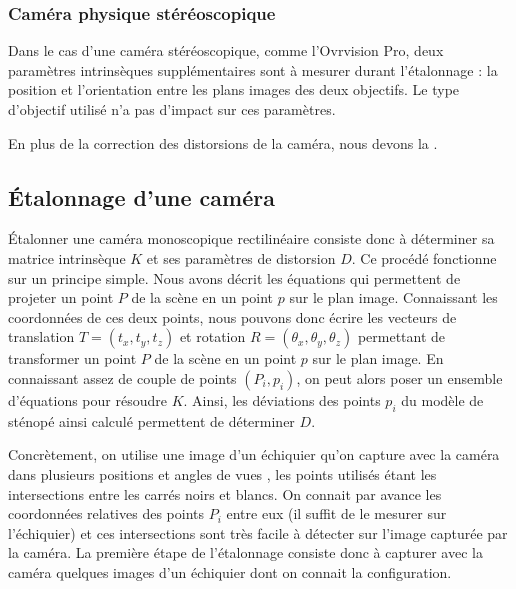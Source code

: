 \subsubsection{Caméra physique stéréoscopique}
Dans le cas d'une caméra stéréoscopique, comme l'Ovrvision Pro, deux paramètres intrinsèques supplémentaires sont à mesurer durant l'étalonnage : la position et l'orientation entre les plans images des deux objectifs. Le type d'objectif utilisé n'a pas d'impact sur ces paramètres.

En plus de la correction des distorsions de la caméra, nous devons la .

\subsection{Étalonnage d'une caméra}
\label{subsec:pinhole_camera_calibration}
Étalonner une caméra monoscopique rectilinéaire consiste donc à déterminer sa matrice intrinsèque $K$ et ses paramètres de distorsion $D$. Ce procédé fonctionne sur un principe simple. Nous avons décrit les équations qui permettent de projeter un point $P$ de la scène en un point $p$ sur le plan image. Connaissant les coordonnées de ces deux points, nous pouvons donc écrire les vecteurs de translation $T = (t_x, t_y, t_z)$ et rotation $R = (\theta_x, \theta_y, \theta_z)$ permettant de transformer un point $P$ de la scène en un point $p$ sur le plan image. En connaissant assez de couple de points $(P_i, p_i)$, on peut alors poser un ensemble d'équations pour résoudre $K$. Ainsi, les déviations des points $p_i$ du modèle de sténopé ainsi calculé permettent de déterminer $D$.

Concrètement, on utilise une image d'un échiquier qu'on capture avec la caméra dans plusieurs positions et angles de vues , les points utilisés étant les intersections entre les carrés noirs et blancs. On connait par avance les coordonnées relatives des points $P_i$ entre eux (il suffit de le mesurer sur l'échiquier) et ces intersections sont très facile à détecter sur l'image capturée par la caméra. La première étape de l'étalonnage consiste donc à capturer avec la caméra quelques images d'un échiquier dont on connait la configuration.


